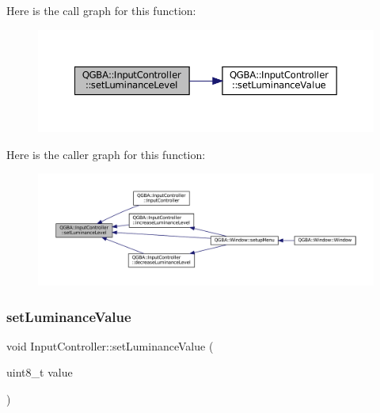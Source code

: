 Here is the call graph for this function\+:
\nopagebreak
\begin{figure}[H]
\begin{center}
\leavevmode
\includegraphics[width=350pt]{class_q_g_b_a_1_1_input_controller_a2fc1c459b9c0d22e2222e766be1ec65f_cgraph}
\end{center}
\end{figure}
Here is the caller graph for this function\+:
\nopagebreak
\begin{figure}[H]
\begin{center}
\leavevmode
\includegraphics[width=350pt]{class_q_g_b_a_1_1_input_controller_a2fc1c459b9c0d22e2222e766be1ec65f_icgraph}
\end{center}
\end{figure}
\mbox{\label{class_q_g_b_a_1_1_input_controller_af4565a7e323e79cc1c75a9d04b8df989}} 
\subsubsection{\texorpdfstring{set\+Luminance\+Value}{setLuminanceValue}}
{\footnotesize\ttfamily void Input\+Controller\+::set\+Luminance\+Value (\begin{DoxyParamCaption}\item[{uint8\+\_\+t}]{value }\end{DoxyParamCaption})\hspace{0.3cm}{\ttfamily [slot]}}

